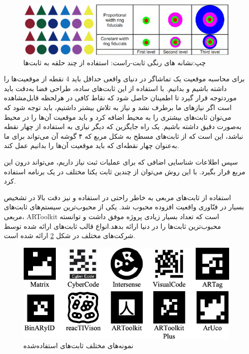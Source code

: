 	\begin{figure}
		\centering
		\includegraphics[width=1\linewidth]{image/fiducial}
		\caption {چپ:نشانه های رنگی ثابت-راست: استفاده از چند حلقه به ثابت‌ها\cite{basiratzadeh2019fiducial}}
		\label{fig:fiducial}
	\end{figure}
	برای محاسبه موقعیت یک تماشاگر در دنیای واقعی حداقل باید 4 نقطه از موقعیت‌ها را داشته باشیم و بدانیم. با استفاده از این ثابت‌های ساده، طراحی فضا به‌دقت باید موردتوجه قرار گیرد تا اطمینان حاصل شود که نقاط کافی در هرلحظه قابل‌مشاهده است اگر نیازهای ما برطرف نشد و نیاز به تلاش بیشتر داشتیم، باید توجه شود که می‌توان ثابت‌های بیشتری را به محیط اضافه کرد و باید موقعیت آن‌ها را در محیط به‌صورت دقیق داشته باشیم. یک راه جایگزین که دیگر نیازی به استفاده از چهار نقطه نباشد، این است که از ثابت‌های مسطح به شکل مربع که ۴ گوشه آن می‌تواند برای ما به‌عنوان چهار نقطه‌ای که باید موقعیت آن‌ها را بدانیم عمل کند.
	
	سپس اطلاعات شناسایی اضافی که برای عملیات ثبت نیاز داریم، می‌تواند درون این مربع قرار بگیرد. با این روش می‌توان از چندین ثابت یکتا مختلف در یک برنامه استفاده کرد.
	
	استفاده از ثابت‌های مربعی  به خاطر راحتی در استفاده و نیز دقت بالا در تشخیص بسیار در فنّاوری واقعیت افزوده محبوب شد. یکی از محبوب‌ترین سیستم‌های ثابت‌های مربعی، ARToolkit است که تعداد بسیار زیادی پروژه موفق داشت و توانسته محبوب‌ترین ثابت‌ها را در دنیا ارائه بدهد\cite{ma2019projected}.انواع قالب ثابت‌های ارائه شده توسط  شرکت‌های مختلف در شکل \ref{fig:ARtoolkit} ارائه شده است.
	
		\begin{figure}
		\centering
		\includegraphics[width=1\linewidth]{image/ARtoolkit}
		\caption {نمونه‌های مختلف ثابت‌های استفاده‌شده  \cite{fiducial}}
		\label{fig:ARtoolkit}
	\end{figure}
	
